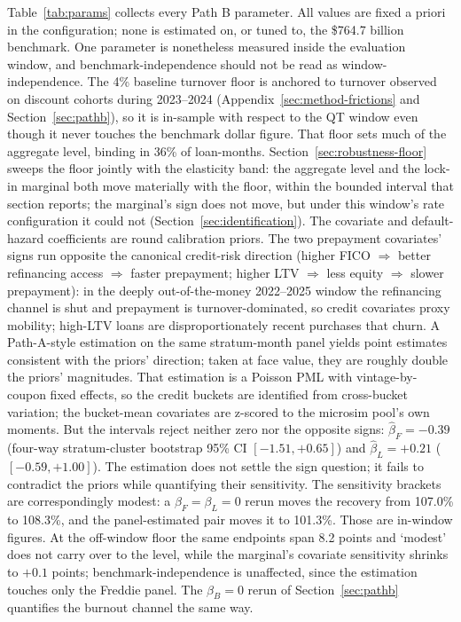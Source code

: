 \documentclass[12pt]{article}
\begin{document}
Table~\ref{tab:params} collects every Path B parameter. All values are fixed a priori in the configuration; none is estimated on, or tuned to, the \$764.7 billion benchmark. One parameter is nonetheless measured inside the evaluation window, and benchmark-independence should not be read as window-independence. The 4\% baseline turnover floor is anchored to turnover observed on discount cohorts during 2023--2024 (Appendix~\ref{sec:method-frictions} and Section~\ref{sec:pathb}), so it is in-sample with respect to the QT window even though it never touches the benchmark dollar figure. That floor sets much of the aggregate level, binding in 36\% of loan-months. Section~\ref{sec:robustness-floor} sweeps the floor jointly with the elasticity band: the aggregate level and the lock-in marginal both move materially with the floor, within the bounded interval that section reports; the marginal's sign does not move, but under this window's rate configuration it could not (Section~\ref{sec:identification}). The covariate and default-hazard coefficients are round calibration priors. The two prepayment covariates' signs run opposite the canonical credit-risk direction (higher FICO $\Rightarrow$ better refinancing access $\Rightarrow$ faster prepayment; higher LTV $\Rightarrow$ less equity $\Rightarrow$ slower prepayment): in the deeply out-of-the-money 2022--2025 window the refinancing channel is shut and prepayment is turnover-dominated, so credit covariates proxy mobility; high-LTV loans are disproportionately recent purchases that churn. A Path-A-style estimation on the same stratum-month panel yields point estimates consistent with the priors' direction; taken at face value, they are roughly double the priors' magnitudes. That estimation is a Poisson PML with vintage-by-coupon fixed effects, so the credit buckets are identified from cross-bucket variation; the bucket-mean covariates are z-scored to the microsim pool's own moments. But the intervals reject neither zero nor the opposite signs: $\hat{\beta}_F = -0.39$ (four-way stratum-cluster bootstrap 95\% CI $[-1.51, +0.65]$) and $\hat{\beta}_L = +0.21$ ($[-0.59, +1.00]$). The estimation does not settle the sign question; it fails to contradict the priors while quantifying their sensitivity. The sensitivity brackets are correspondingly modest: a $\beta_F = \beta_L = 0$ rerun moves the recovery from 107.0\% to 108.3\%, and the panel-estimated pair moves it to 101.3\%. Those are in-window figures. At the off-window floor the same endpoints span 8.2 points and `modest' does not carry over to the level, while the marginal's covariate sensitivity shrinks to $+0.1$ points; benchmark-independence is unaffected, since the estimation touches only the Freddie panel. The $\beta_B = 0$ rerun of Section~\ref{sec:pathb} quantifies the burnout channel the same way.
\end{document}
